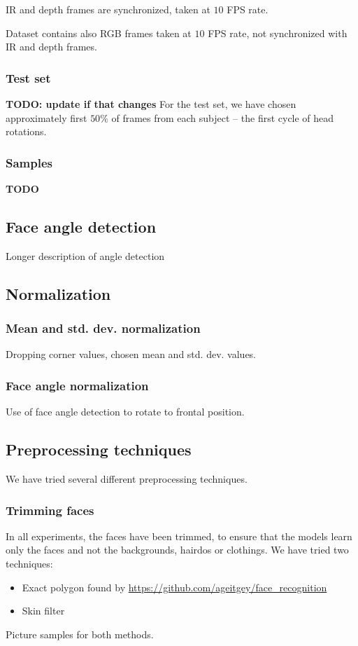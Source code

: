     IR and depth frames are synchronized, taken at $10$ FPS rate.

    Dataset contains also RGB frames taken at $10$ FPS rate, not synchronized
    with IR and depth frames.

    \subsubsection*{Test set}
    \textbf{TODO: update if that changes}
    For the test set, we have chosen approximately first $50\%$ of
    frames from each subject -- the first cycle of head rotations.

    \subsubsection*{Samples}
    \textbf{TODO}

    \subsection{Face angle detection}
    Longer description of angle detection

    \subsection{Normalization}
        \subsubsection*{Mean and std. dev. normalization}
        Dropping corner values, chosen mean and std. dev. values.

        \subsubsection*{Face angle normalization}
        Use of face angle detection to rotate to frontal position.

    \subsection{Preprocessing techniques}
    We have tried several different preprocessing techniques.
        \subsubsection*{Trimming faces}
        In all experiments, the faces have been trimmed, to ensure that the
        models learn only the faces and not the backgrounds, hairdos or
        clothings.
        We have tried two techniques:
        \begin{itemize}
            \item Exact polygon found by \url{https://github.com/ageitgey/face_recognition}
            \item Skin filter
        \end{itemize}
        Picture samples for both methods.

